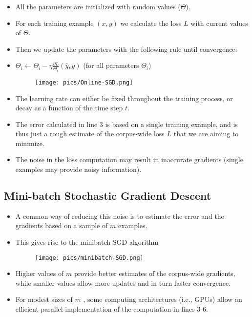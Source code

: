 \begin{itemize}
\item All the parameters are initialized with random values ($\Theta$).
\item For each training example $(x,y)$ we calculate the loss $L$ with current values of $\Theta$.
\item Then we update the parameters with the following rule until convergence:
\item $\Theta_i \leftarrow \Theta_i - \eta \frac{\partial L}{\Theta_i}(\hat{y},y)$  (for all parameters $\Theta_i$)

\begin{figure}[htb]
	\centering
	 \texttt{[image: pics/Online-SGD.png]}
\end{figure}
\item The learning rate can either be fixed throughout the
training process, or decay as a function of the time step $t$.
\item  The error calculated in line 3 is based on a single training example, and is thus just a rough estimate of the corpus-wide loss $L$ that we are aiming to minimize. 
\item The noise in the loss computation may result in inaccurate gradients (single examples may provide noisy information).

\end{itemize}






\subsection{Mini-batch Stochastic Gradient Descent}
\begin{itemize}
\item A common way of reducing this noise is
to estimate the error and the gradients based on a sample of $m$ examples.
\item This gives rise to the minibatch SGD algorithm
\begin{figure}[htb]
	\centering
	 \texttt{[image: pics/minibatch-SGD.png]}
\end{figure}

\item Higher values of $m$ provide better estimates of the corpus-wide gradients, while smaller values allow more updates and in turn faster convergence.

\item For modest sizes of $m$ , some computing architectures (i.e., GPUs) allow an efficient parallel implementation of the computation in lines 3-6.

\end{itemize}

